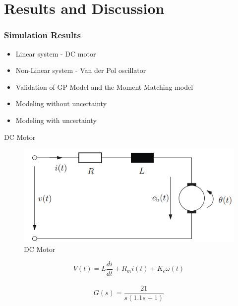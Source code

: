 \section{Results and Discussion}

\begin{frame}	\frametitle{Simulation Results}
	\begin{itemize}
 \item Linear system -  DC motor
 \item Non-Linear system - Van der Pol oscillator
            \item Validation of GP Model and the Moment Matching model
            \item Modeling without uncertainty
            \item Modeling with uncertainty


            
\end{itemize}
\end{frame}


\begin{frame}{DC Motor\cite{werner2023grt}}
            \begin{figure}
                \centering
                \includegraphics[width=0.6\linewidth]{figures//Results/DC_motor.png}
                \caption{DC Motor}
            \end{figure}
   \[ V(t) = L\frac{di}{dt} + R_m i(t) + K_e \omega(t) \] \\ 
     \[G(s) = \frac{21}{s(1.1s + 1)}\]

   
\end{frame}


